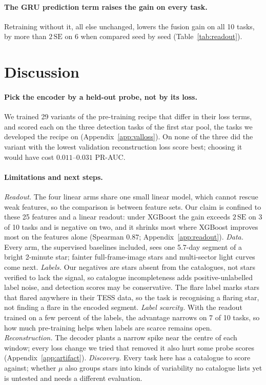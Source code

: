 \documentclass{article}
\begin{document}
\paragraph{The GRU prediction term raises the gain on every task.} Retraining without it,
all else unchanged, lowers the fusion gain on all 10 tasks, by more than $2\,\mathrm{SE}$ on 6 when
compared seed by seed (Table~\ref{tab:readout}).

\section{Discussion}

\paragraph{Pick the encoder by a held-out probe, not by its loss.} We trained 29 variants of
the pre-training recipe that differ in their loss terms, and scored each on the three detection
tasks of the first star pool, the tasks we developed the recipe on (Appendix~\ref{app:valloss}).
On none of the three did the variant with the lowest validation reconstruction loss score best; choosing it would have cost $0.011$--$0.031$
PR-AUC.

\paragraph{\textbf{Limitations and next steps.}} \emph{Readout.} The four linear arms share one small linear model, which
cannot rescue weak features, so the comparison is between feature sets. Our claim is confined to
these 25 features and a linear readout: under XGBoost the gain exceeds $2\,\mathrm{SE}$ on 3 of 10
tasks and is negative on two, and it shrinks most where XGBoost improves most on the features alone
(Spearman $0.87$; Appendix~\ref{app:readout}). \emph{Data.} Every arm, the supervised baselines
included, sees one 5.7-day segment of a bright 2-minute star; fainter full-frame-image stars and
multi-sector light curves come next. \emph{Labels.} Our
negatives are stars absent from the catalogues, not stars verified to lack the signal, so
catalogue incompleteness adds positive-unlabelled label noise, and detection scores may be
conservative. The flare label marks stars that flared anywhere in their TESS data, so the task is
recognising a flaring star, not finding a flare in the encoded segment. \emph{Label scarcity.} With
the readout trained on a few percent of the labels, the advantage narrows on 7 of 10 tasks, so how
much pre-training helps when labels are scarce remains open. \emph{Reconstruction.} The decoder
plants a narrow spike near the centre of each window; every loss change we tried that removed it
also hurt some probe scores (Appendix~\ref{app:artifact}). \emph{Discovery.} Every task here has a
catalogue to score against; whether $\mu$ also groups stars into kinds of variability no
catalogue lists yet is untested and needs a different evaluation.
\end{document}
